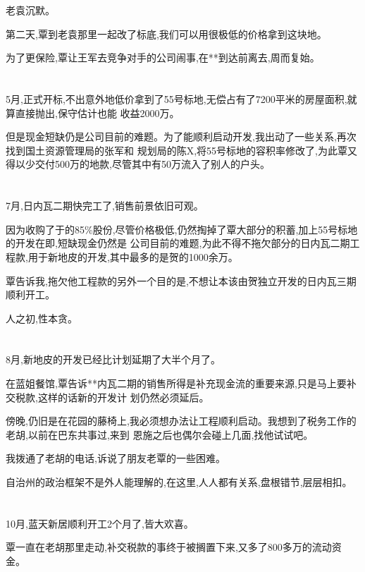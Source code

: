 \documentclass[11pt]{article}
\begin{document}
老袁沉默。

第二天,覃到老袁那里一起改了标底,我们可以用很极低的价格拿到这块地。

为了更保险,覃让王军去竞争对手的公司闹事,在**到达前离去,周而复始。

\section{}
5月,正式开标,不出意外地低价拿到了55号标地,无偿占有了7200平米的房屋面积,就算直接抛出,保守估计也能
收益2000万。

但是现金短缺仍是公司目前的难题。为了能顺利启动开发,我出动了一些关系,再次找到国土资源管理局的张军和
规划局的陈X,将55号标地的容积率修改了,为此覃又得以少交付500万的地款,尽管其中有50万流入了别人的户头。



\section{}
7月,日内瓦二期快完工了,销售前景依旧可观。

因为收购了于的85\%股份,尽管价格极低,仍然掏掉了覃大部分的积蓄,加上55号标地的开发在即,短缺现金仍然是
公司目前的难题,为此不得不拖欠部分的日内瓦二期工程款,用于新地皮的开发,其中最多的是贺的1000余万。

覃告诉我,拖欠他工程款的另外一个目的是,不想让本该由贺独立开发的日内瓦三期顺利开工。

人之初,性本贪。

\section{}
8月,新地皮的开发已经比计划延期了大半个月了。

在蓝姐餐馆,覃告诉**内瓦二期的销售所得是补充现金流的重要来源,只是马上要补交税款,这样的话新的开发计
划仍然必须延后。

傍晚,仍旧是在花园的藤椅上,我必须想办法让工程顺利启动。我想到了税务工作的老胡,以前在巴东共事过,来到
恩施之后也偶尔会碰上几面,找他试试吧。

我拨通了老胡的电话,诉说了朋友老覃的一些困难。

自治州的政治框架不是外人能理解的,在这里,人人都有关系,盘根错节,层层相扣。

\section{}
10月,蓝天新居顺利开工2个月了,皆大欢喜。

覃一直在老胡那里走动,补交税款的事终于被搁置下来,又多了800多万的流动资金。
\end{document}

